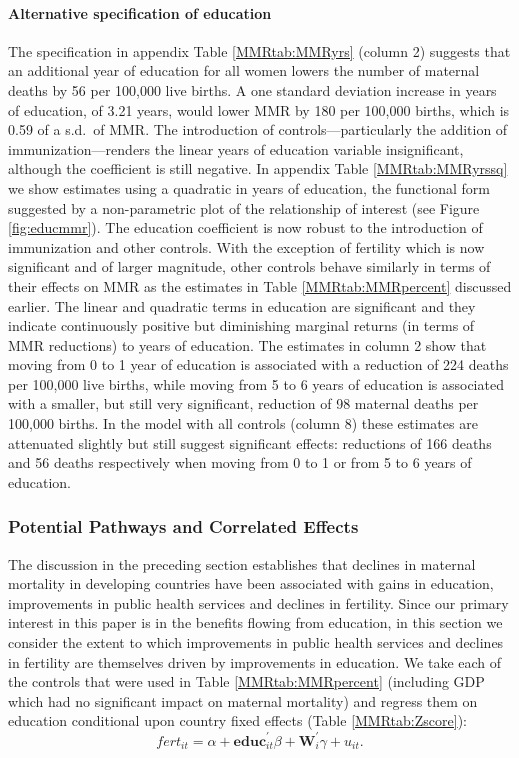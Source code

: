 \documentclass{article}[12pt,subeqn]
\begin{document}
\begin{spacing}{1.4}
\paragraph{Alternative specification of education}
The specification in appendix Table \ref{MMRtab:MMRyrs} (column 2) suggests that an 
additional year of education for all women lowers the number of maternal deaths 
by 56 per 100,000 live births. A one standard deviation increase in years of 
education, of 3.21 years, would lower MMR by 180 per 100,000 births, which is 0.59 
of a s.d.\ of MMR. The introduction of controls---particularly the addition of 
immunization---renders the linear years of education variable insignificant, 
although the coefficient is still negative. In appendix Table 
\ref{MMRtab:MMRyrssq} we show estimates using a quadratic in years of education, 
the functional form suggested by a non-parametric plot of the relationship of 
interest (see Figure \ref{fig:educmmr}). The education coefficient is now robust 
to the introduction of immunization and other controls. With the exception of 
fertility which is now significant and of larger magnitude, other controls 
behave similarly in terms of their effects on MMR as the estimates in Table 
\ref{MMRtab:MMRpercent} discussed earlier. The linear and quadratic terms in education are 
significant and they indicate continuously positive but diminishing marginal 
returns (in terms of MMR reductions) to years of education. The estimates in 
column 2 show that moving from 0 to 1 year of education is associated with a 
reduction of 224 deaths per 100,000 live births, while moving from 5 to 6 years 
of education is associated with a smaller, but still very significant, reduction 
of 98 maternal deaths per 100,000 births. In the model with all controls (column 
8) these estimates are attenuated slightly but still suggest significant effects: 
reductions of 166 deaths and 56 deaths respectively when moving from 0 to 1 or 
from 5 to 6 years of education.

\subsubsection{Potential Pathways and Correlated Effects}
\label{ssscn:effects}
The discussion in the preceding section establishes that declines in maternal 
mortality in developing countries have been associated with gains in education, 
improvements in public health services and declines in fertility. Since our 
primary interest in this paper is in the benefits flowing from education, in this 
section we consider the extent to which improvements in public health services and 
declines in fertility are themselves driven by improvements in education. We take 
each of the controls that were used in Table \ref{MMRtab:MMRpercent} (including 
GDP which had no significant impact on maternal mortality) and regress them on 
education conditional upon country fixed effects (Table \ref{MMRtab:Zscore}):
\begin{equation}
\label{eqn:Zscore}
  fert_{it}=\alpha + \mathbf{educ}^\prime_{it}\beta + \mathbf{W}^\prime_i\gamma 
  + u_{it}.
\end{equation}


\end{spacing}
\end{document}
